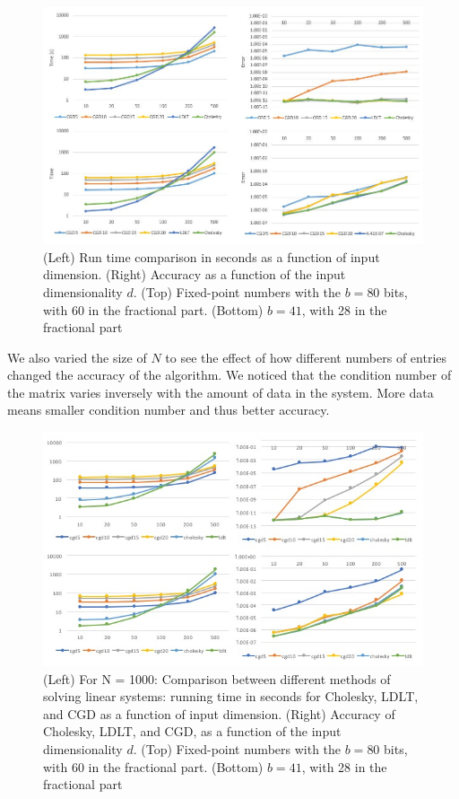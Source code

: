 \documentclass{article}
\theoremstyle{plain}
\theoremstyle{definition}
\theoremstyle{remark}
\begin{document}
\begin{figure}[h]
\centering
  \includegraphics[scale=0.47]{results1.jpg}
  \caption{(Left) Run time comparison in seconds as a function of input dimension. (Right) Accuracy as a function of the input dimensionality $d$. (Top) Fixed-point numbers with the $b = 80$ bits, with 60 in the fractional part. (Bottom) $b = 41$, with 28 in the fractional part}
  \label{fig:result2}
\end{figure}

\noindent
We also varied the size of $N$ to see the effect of how different numbers of entries changed the accuracy of the algorithm. We noticed that the condition number of the matrix varies inversely with the amount of data in the system. More data means smaller condition number and thus better accuracy.

\begin{figure}[h]
\centering
  \includegraphics[scale=0.5]{results2.jpg}
  \caption{(Left) For N = 1000: Comparison between different methods of solving linear systems: running time in seconds for Cholesky, LDLT, and CGD as a function of input dimension. (Right) Accuracy of Cholesky, LDLT, and CGD, as a function of the input dimensionality $d$. (Top) Fixed-point numbers with the $b = 80$ bits, with 60 in the fractional part. (Bottom) $b = 41$, with 28 in the fractional part}
  \label{fig:result2}
\end{figure}  
\end{document}
